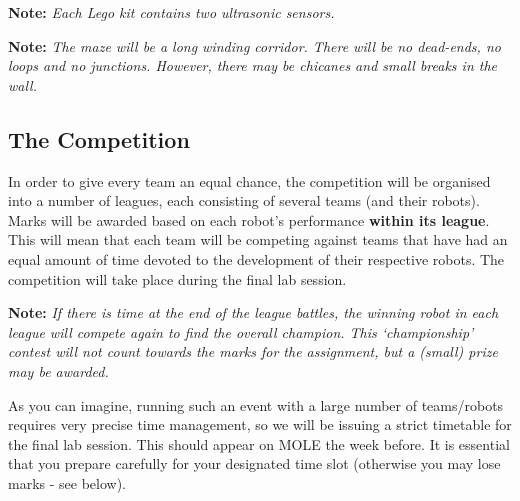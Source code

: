 \documentclass[hidelinks,a4paper,11pt]{article}
\begin{document}
	{\bfseries Note:}  \emph{Each Lego kit contains two ultrasonic sensors.}
	
	{\bfseries Note:}  \emph{The maze will be a long winding corridor.  There will be no dead-ends, no loops and no junctions.  However, there may be chicanes and small breaks in the wall.}
	
	
	\subsection{The Competition}
	
	In order to give every team an equal chance, the competition will be organised into a number of leagues, each consisting of several teams (and their robots).  Marks will be awarded based on each robot's performance \textbf{within its league}.  This will mean that each team will be competing against teams that have had an equal amount of time devoted to the development of their respective robots.  The competition will take place during the final lab session.
	
	{\bfseries Note:}  \emph{If there is time at the end of the league battles, the winning robot in each league will compete again to find the overall champion.  This `championship' contest will not count towards the marks for the assignment, but a (small) prize may be awarded.}
	
	As you can imagine, running such an event with a large number of teams/robots requires very precise time management, so we will be issuing a strict timetable for the final lab session.  This should appear on MOLE the week before.  It is essential that you prepare carefully for your designated time slot (otherwise you may lose marks - see below).
	
\end{document}
